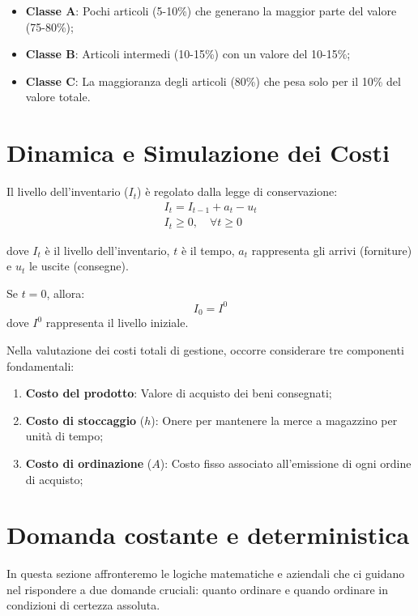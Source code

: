 \begin{itemize}
    \item \textbf{Classe A}: Pochi articoli (5-10\%) che generano la maggior parte del valore (75-80\%);
    \item \textbf{Classe B}: Articoli intermedi (10-15\%) con un valore del 10-15\%;
    \item \textbf{Classe C}: La maggioranza degli articoli (80\%) che pesa solo per il 10\% del valore totale.
\end{itemize}

%
\section{Dinamica e Simulazione dei Costi} \label{sec:dinamica_sim}
Il livello dell'inventario ($I_t$) è regolato dalla legge di conservazione:
\begin{gather*}
    I_t = I_{t-1} + a_t - u_t \\
    I_{t}\geq 0, \quad \forall t \geq 0
\end{gather*}

dove $ I_{t} $ è il livello dell'inventario, $ t $ è il tempo, $a_t$ rappresenta gli arrivi (forniture) e $u_t$ le uscite (consegne).

Se $ t=0 $, allora:
\[
    I_{0} = I^{0}
\]
dove $ I^{0} $ rappresenta il livello iniziale.

Nella valutazione dei costi totali di gestione, occorre considerare tre componenti fondamentali:
\begin{enumerate}
    \item \textbf{Costo del prodotto}: Valore di acquisto dei beni consegnati;
    \item \textbf{Costo di stoccaggio} ($h$): Onere per mantenere la merce a magazzino per unità di tempo;
    \item \textbf{Costo di ordinazione} ($A$): Costo fisso associato all'emissione di ogni ordine di acquisto;
\end{enumerate}

%
\section{Domanda costante e deterministica}
In questa sezione affronteremo le logiche matematiche e aziendali che ci guidano nel rispondere a due domande cruciali: quanto ordinare e quando ordinare in condizioni di certezza assoluta.
%

